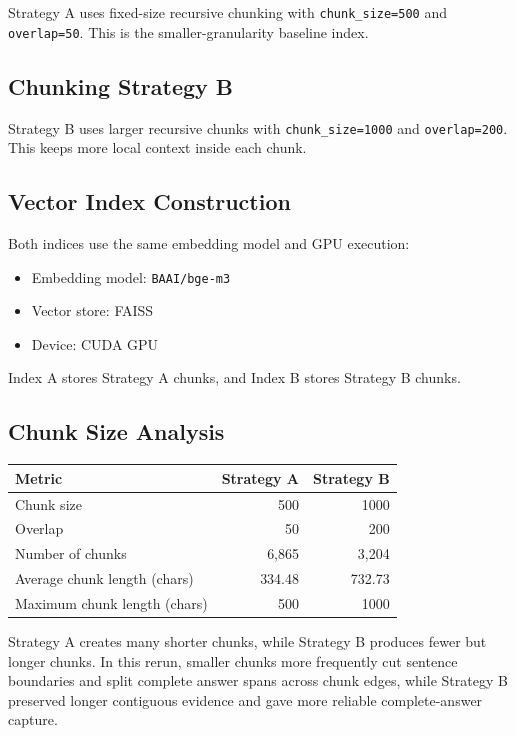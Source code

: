 \documentclass[12pt,a4paper]{article}
\begin{document}
Strategy A uses fixed-size recursive chunking with \texttt{chunk\_size=500} and \texttt{overlap=50}. This is the smaller-granularity baseline index.

\subsection{Chunking Strategy B}

Strategy B uses larger recursive chunks with \texttt{chunk\_size=1000} and \texttt{overlap=200}. This keeps more local context inside each chunk.

\subsection{Vector Index Construction}

Both indices use the same embedding model and GPU execution:

\begin{itemize}
    \item Embedding model: \texttt{BAAI/bge-m3}
    \item Vector store: FAISS
    \item Device: CUDA GPU
\end{itemize}

Index A stores Strategy A chunks, and Index B stores Strategy B chunks.

\subsection{Chunk Size Analysis}

\begin{table}[H]
\centering
\begin{tabular}{lrr}
\toprule
\textbf{Metric} & \textbf{Strategy A} & \textbf{Strategy B} \\
\midrule
Chunk size & 500 & 1000 \\
Overlap & 50 & 200 \\
Number of chunks & 6,865 & 3,204 \\
Average chunk length (chars) & 334.48 & 732.73 \\
Maximum chunk length (chars) & 500 & 1000 \\
\bottomrule
\end{tabular}
\end{table}

Strategy A creates many shorter chunks, while Strategy B produces fewer but longer chunks. In this rerun, smaller chunks more frequently cut sentence boundaries and split complete answer spans across chunk edges, while Strategy B preserved longer contiguous evidence and gave more reliable complete-answer capture.
\end{document}
